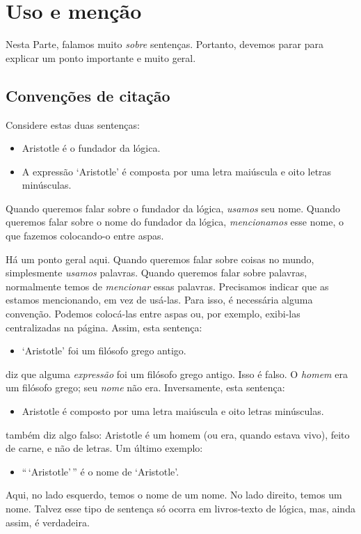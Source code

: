 \chapter{Uso e menção}\label{s:UseMention}
Nesta Parte, falamos muito \emph{sobre} sentenças. Portanto, devemos
parar para explicar um ponto importante e muito geral.

\section{Convenções de citação}
Considere estas duas sentenças:
	\begin{itemize}
		\item Aristotle é o fundador da lógica.
		\item A expressão `Aristotle' é composta por uma letra maiúscula e oito letras minúsculas.
	\end{itemize}
Quando queremos falar sobre o fundador da lógica, \emph{usamos} seu nome.
Quando queremos falar sobre o nome do fundador da lógica, \emph{mencionamos}
esse nome, o que fazemos colocando-o entre aspas.

Há um ponto geral aqui. Quando queremos falar sobre coisas no mundo,
simplesmente \emph{usamos} palavras. Quando queremos falar sobre palavras,
normalmente temos de \emph{mencionar} essas palavras. Precisamos indicar que
as estamos mencionando, em vez de usá-las. Para isso, é necessária alguma
convenção. Podemos colocá-las entre aspas ou, por exemplo, exibi-las
centralizadas na página. Assim, esta sentença:
	\begin{itemize}
		\item `Aristotle' foi um filósofo grego antigo.
	\end{itemize}
diz que alguma \emph{expressão} foi um filósofo grego antigo.
Isso é falso. O \emph{homem} era um filósofo grego; seu \emph{nome} não
era. Inversamente, esta sentença:
	\begin{itemize}
		\item Aristotle é composto por uma letra maiúscula e oito letras minúsculas.
	\end{itemize}
também diz algo falso: Aristotle é um homem (ou era, quando estava vivo),
feito de carne, e não de letras. Um último exemplo:
	\begin{itemize}
		\item ``\,`Aristotle'\,'' é o nome de `Aristotle'.
	\end{itemize}
Aqui, no lado esquerdo, temos o nome de um nome. No lado direito, temos um
nome. Talvez esse tipo de sentença só ocorra em livros-texto de lógica,
mas, ainda assim, é verdadeira.

